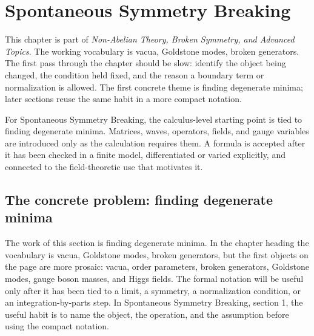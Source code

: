 \chapter{Spontaneous Symmetry Breaking}


This chapter is part of \emph{Non-Abelian Theory, Broken Symmetry, and Advanced Topics}.  The working vocabulary is vacua, Goldstone modes, broken generators.  The first pass through the chapter should be slow: identify the object being changed, the condition held fixed, and the reason a boundary term or normalization is allowed.  The first concrete theme is finding degenerate minima; later sections reuse the same habit in a more compact notation.

For Spontaneous Symmetry Breaking, the calculus-level starting point is tied to finding degenerate minima.  Matrices, waves, operators, fields, and gauge variables are introduced only as the calculation requires them.  A formula is accepted after it has been checked in a finite model, differentiated or varied explicitly, and connected to the field-theoretic use that motivates it.

\section{The concrete problem: finding degenerate minima}













The work of this section is finding degenerate minima.  In the chapter heading the vocabulary is vacua, Goldstone modes, broken generators, but the first objects on the page are more prosaic: vacua, order parameters, broken generators, Goldstone modes, gauge boson masses, and Higgs fields.  The formal notation will be useful only after it has been tied to a limit, a symmetry, a normalization condition, or an integration-by-parts step.  In Spontaneous Symmetry Breaking, section 1, the useful habit is to name the object, the operation, and the assumption before using the compact notation.

